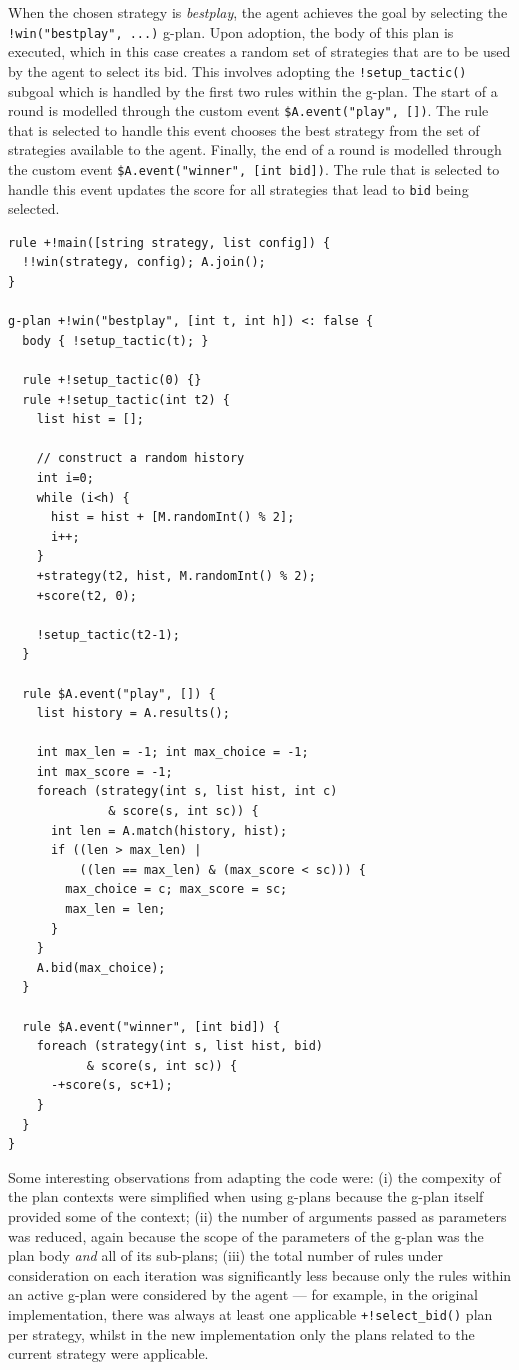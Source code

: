 When the chosen strategy is \emph{bestplay}, the agent achieves the goal by selecting 
the \verb|!win("bestplay", ...)| g-plan. Upon adoption, the body of this plan is executed, which 
in this case creates a random set of strategies that are to be used by the agent to select its 
bid. This involves adopting the \verb|!setup_tactic()| subgoal which is handled by the first two 
rules within the g-plan. The start of a round is modelled through the custom event 
\verb|$A.event("play", [])|. The rule that is selected to handle this event chooses the best 
strategy from the set of strategies available to the agent. Finally, the end of a round is modelled 
through the custom event \verb|$A.event("winner", [int bid])|. The rule that is selected to handle 
this event updates the score for all strategies that lead to \verb|bid| being selected.

{\small
\begin{verbatim}
rule +!main([string strategy, list config]) {
  !!win(strategy, config); A.join();
}

g-plan +!win("bestplay", [int t, int h]) <: false {
  body { !setup_tactic(t); }

  rule +!setup_tactic(0) {}
  rule +!setup_tactic(int t2) {
    list hist = [];
			
    // construct a random history
    int i=0;
    while (i<h) {
      hist = hist + [M.randomInt() % 2];
      i++;
    }
    +strategy(t2, hist, M.randomInt() % 2);
    +score(t2, 0);
		
    !setup_tactic(t2-1);
  }
		
  rule $A.event("play", []) { 
    list history = A.results();
			
    int max_len = -1; int max_choice = -1;
    int max_score = -1;
    foreach (strategy(int s, list hist, int c) 
              & score(s, int sc)) {
      int len = A.match(history, hist);
      if ((len > max_len) | 
          ((len == max_len) & (max_score < sc))) {
        max_choice = c; max_score = sc;
        max_len = len;
      }
    }
    A.bid(max_choice);
  }

  rule $A.event("winner", [int bid]) {
    foreach (strategy(int s, list hist, bid) 
           & score(s, int sc)) {
      -+score(s, sc+1);
    }
  }
}
\end{verbatim}}

Some interesting observations from adapting the code were: (i) the compexity of the plan contexts 
were simplified when using g-plans because the g-plan itself provided some of the context; (ii) 
the number of arguments passed as parameters was reduced, again because the scope of the parameters 
of the g-plan was the plan body \emph{and} all of its sub-plans; (iii) the total number of rules 
under consideration on each iteration was significantly less because only the rules within an 
active g-plan were considered by the agent --- for example, in the original implementation, there 
was always at least one applicable \verb|+!select_bid()| plan per strategy, whilst in the new 
implementation only the plans related to the current strategy were applicable.

